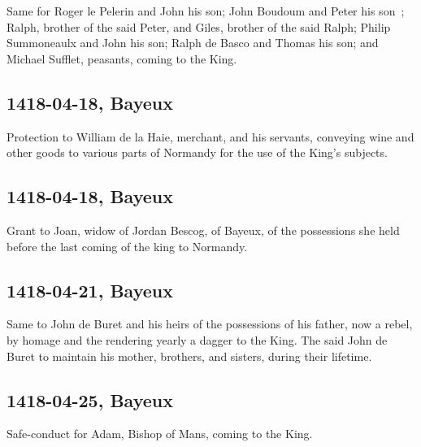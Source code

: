 \documentclass[a4paper,12pt,twoside]{book}
\begin{document}
                     Same for Roger le Pelerin and John his son; John Boudoum and Peter his son ; Ralph, brother of the said Peter, and Giles, brother of the said Ralph; Philip Summoneaulx and John his son; Ralph de Basco and Thomas his son; and Michael Sufflet, peasants, coming to the King.
                  
            \subsection{1418-04-18, Bayeux}
            
                     Protection to William de la Haie, merchant, and his servants, conveying wine and other goods to various parts of Normandy for the use of the King's subjects.
                  
            \subsection{1418-04-18, Bayeux}
            
                     Grant to Joan, widow of Jordan Bescog, of Bayeux, of the possessions she held before the last coming of the king to Normandy.
                  
            \subsection{1418-04-21, Bayeux}
            
                     Same to John de Buret and his heirs of the possessions of his father, now a rebel, by homage and the rendering yearly a dagger to the King. The said John de Buret to maintain his mother, brothers, and sisters, during their lifetime.
                  
            \subsection{1418-04-25, Bayeux}
            
                     Safe-conduct for Adam, Bishop of Mans, coming to the King.
                  
\end{document}
